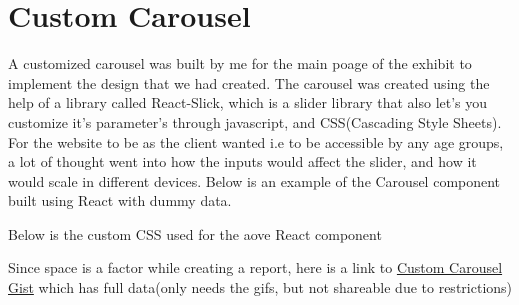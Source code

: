 
\chapter{Custom Carousel} %
\label{AppendixB} %


A customized carousel was built by me for the main poage of the exhibit to implement the design that we had created. The carousel was created using the help of a library called React-Slick, which is a slider library that also let's you customize it's parameter's through javascript, and CSS(Cascading Style Sheets). 
For the website to be as the client wanted i.e to be accessible by any age groups, a lot of thought went into how the inputs would affect the slider, and how it would scale in different devices. Below is an example of the Carousel component built using React with dummy data.



Below is the custom CSS used for the aove React component



Since space is a factor while creating a report, here is a link to \href{https://gist.github.com/BlankRiser/f904353998562ae974735a561ed9cfb2}{Custom Carousel Gist} which has full data(only needs the gifs, but not shareable due to restrictions)
